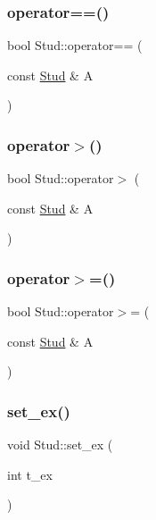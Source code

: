 \subsubsection{\texorpdfstring{operator==()}{operator==()}}
{\footnotesize\ttfamily bool Stud\+::operator== (\begin{DoxyParamCaption}\item[{const \mbox{\hyperlink{class_stud}{Stud}} \&}]{A }\end{DoxyParamCaption})}

\mbox{\label{class_stud_a36be89d64a926e7ef2e5c07f97364998}} 
\subsubsection{\texorpdfstring{operator$>$()}{operator>()}}
{\footnotesize\ttfamily bool Stud\+::operator$>$ (\begin{DoxyParamCaption}\item[{const \mbox{\hyperlink{class_stud}{Stud}} \&}]{A }\end{DoxyParamCaption})}

\mbox{\label{class_stud_a1d5e445949cab995194094100f7ead13}} 
\subsubsection{\texorpdfstring{operator$>$=()}{operator>=()}}
{\footnotesize\ttfamily bool Stud\+::operator$>$= (\begin{DoxyParamCaption}\item[{const \mbox{\hyperlink{class_stud}{Stud}} \&}]{A }\end{DoxyParamCaption})}

\mbox{\label{class_stud_a5a781181ed2031623963880d294066f2}} 
\subsubsection{\texorpdfstring{set\_ex()}{set\_ex()}\hspace{0.1cm}{\footnotesize\ttfamily [1/2]}}
{\footnotesize\ttfamily void Stud\+::set\+\_\+ex (\begin{DoxyParamCaption}\item[{int}]{t\+\_\+ex }\end{DoxyParamCaption})\hspace{0.3cm}{\ttfamily [inline]}}

